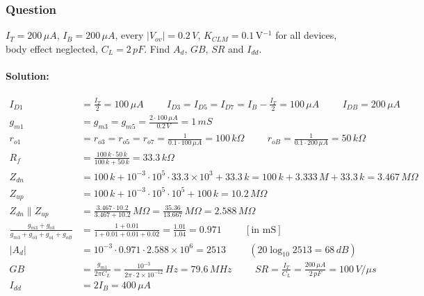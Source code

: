 \subsubsection{Question}
\(I_T = 200\,\mu A\), \(I_B = 200\,\mu A\), every \(|V_{ov}| = 0.2\,V\),
\(K_{CLM} = 0.1\,\)V\(^{-1}\) for all devices, body effect neglected, \(C_L = 2\,pF\).
Find \(A_d\), \(GB\), \(SR\) and \(I_{dd}\).
\paragraph{Solution:}
\begin{align*}
  I_{D1} &= \frac{I_T}{2} = 100\,\mu A \hspace{1cm} I_{D3} = I_{D5} = I_{D7} = I_B - \frac{I_T}{2} = 100\,\mu A \hspace{1cm} I_{DB} = 200\,\mu A \\
  g_{m1} &= g_{m3} = g_{m5} = \frac{2 \cdot 100\,\mu A}{0.2\,V} = 1\,mS \\
  r_{o1} &= r_{o3} = r_{o5} = r_{o7} = \frac{1}{0.1 \cdot 100\,\mu A} = 100\,k\Omega \hspace{1cm} r_{oB} = \frac{1}{0.1 \cdot 200\,\mu A} = 50\,k\Omega \\
  R_f &= \frac{100\,k \cdot 50\,k}{100\,k + 50\,k} = 33.3\,k\Omega \\
  Z_{dn} &= 100\,k + 10^{-3} \cdot 10^{5} \cdot 33.3 \times 10^{3} + 33.3\,k = 100\,k + 3.333\,M + 33.3\,k = 3.467\,M\Omega \\
  Z_{up} &= 100\,k + 10^{-3} \cdot 10^{5} \cdot 10^{5} + 100\,k = 10.2\,M\Omega \\
  Z_{dn} \parallel Z_{up} &= \frac{3.467 \cdot 10.2}{3.467 + 10.2}\,M\Omega = \frac{35.36}{13.667}\,M\Omega = 2.588\,M\Omega \\
  \frac{g_{m3} + g_{o3}}{g_{m3} + g_{o3} + g_{o1} + g_{oB}} &= \frac{1 + 0.01}{1 + 0.01 + 0.01 + 0.02} = \frac{1.01}{1.04} = 0.971 \hspace{1cm} [\text{in mS}] \\
  |A_d| &= 10^{-3} \cdot 0.971 \cdot 2.588 \times 10^{6} = 2513 \hspace{1cm} (20\log_{10} 2513 = 68\,dB) \\
  GB &= \frac{g_{m1}}{2\pi C_L} = \frac{10^{-3}}{2\pi \cdot 2 \times 10^{-12}}\,Hz = 79.6\,MHz \hspace{1cm}
  SR = \frac{I_T}{C_L} = \frac{200\,\mu A}{2\,pF} = 100\,V/\mu s \\
  I_{dd} &= 2 I_B = 400\,\mu A
\end{align*}

